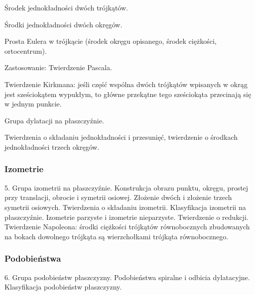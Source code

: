 Środek jednokładności dwóch trójkątów.

Środki jednokładności dwóch okręgów.

Prosta Eulera w trójkącie (środek okręgu opisanego, środek ciężkości, ortocentrum).

Zastosowanie: Twierdzenie Pascala.

Twierdzenie Kirkmana: jeśli część wspólna dwóch trójkątów wpisanych w okrąg jest sześciokątem wypukłym, to główne przekątne tego sześciokąta przecinają się w jednym punkcie.

Grupa dylatacji na płaszczyźnie.

Twierdzenia o składaniu jednokładności i przesunięć, twierdzenie o środkach jednokładności trzech okręgów.

\subsubsection{Izometrie}
5. Grupa izometrii na płaszczyźnie. Konstrukcja obrazu punktu, okręgu, prostej przy translacji, obrocie i symetrii osiowej. Złożenie dwóch i złożenie trzech symetrii osiowych. Twierdzenia o składaniu izometrii. Klasyfikacja izometrii na płaszczyźnie. Izometrie parzyste i izometrie nieparzyste. Twierdzenie o redukcji. Twierdzenie Napoleona: środki ciężkości trójkątów równobocznych zbudowanych na bokach dowolnego trójkąta są wierzchołkami trójkąta równobocznego.

\subsubsection{Podobieństwa}
6. Grupa podobieństw płaszczyzny. Podobieństwa spiralne i odbicia dylatacyjne. Klasyfikacja podobieństw płaszczyzny.
